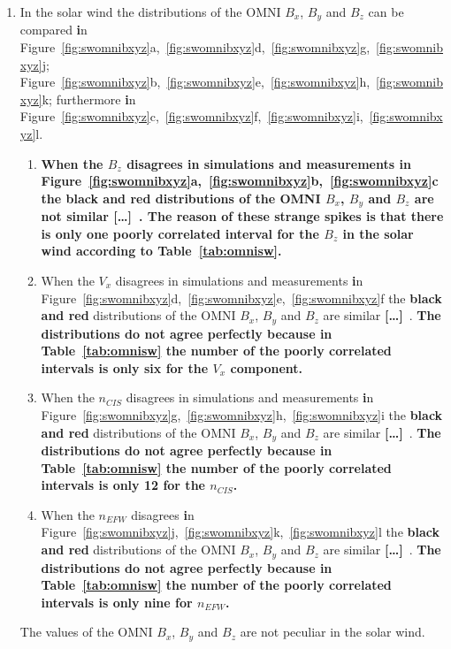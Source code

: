\documentclass[linenumbers,draft]{agujournal}
\newcommand{\del}{\textbf{[\dots]}\ } %
\begin{document}
\begin{enumerate}
\item In the solar wind the distributions of the OMNI $B_{x}$, $B_{y}$ and $B_{z}$ can be compared \textbf{i}n Figure~\ref{fig:swomnibxyz}a,~\ref{fig:swomnibxyz}d,~\ref{fig:swomnibxyz}g,~\ref{fig:swomnibxyz}j; Figure~\ref{fig:swomnibxyz}b,~\ref{fig:swomnibxyz}e,~\ref{fig:swomnibxyz}h,~\ref{fig:swomnibxyz}k; furthermore \textbf{i}n Figure~\ref{fig:swomnibxyz}c,~\ref{fig:swomnibxyz}f,~\ref{fig:swomnibxyz}i,~\ref{fig:swomnibxyz}l.
\begin{enumerate}
\item \textbf{When the $B_{z}$ disagrees in simulations and measurements \textbf{i}n Figure~\ref{fig:swomnibxyz}a,~\ref{fig:swomnibxyz}b,~\ref{fig:swomnibxyz}c the black and red distributions of the OMNI $B_{x}$, $B_{y}$ and $B_{z}$ are not similar \del. The reason of these strange spikes is that there is only one poorly correlated interval for the $B_{z}$ in the solar wind according to Table~\ref{tab:omnisw}.}

\item When the $V_{x}$ disagrees in simulations and measurements \textbf{i}n Figure~\ref{fig:swomnibxyz}d,~\ref{fig:swomnibxyz}e,~\ref{fig:swomnibxyz}f the \textbf{black and red} distributions of the OMNI $B_{x}$, $B_{y}$ and $B_{z}$ are similar \del. \textbf{The distributions do not agree perfectly because in Table~\ref{tab:omnisw} the number of the poorly correlated intervals is only six for the $V_{x}$ component.}

\item When the $n_{CIS}$ disagrees in simulations and measurements \textbf{i}n Figure~\ref{fig:swomnibxyz}g,~\ref{fig:swomnibxyz}h,~\ref{fig:swomnibxyz}i the \textbf{black and red} distributions of the OMNI $B_{x}$, $B_{y}$ and $B_{z}$ are similar \del. \textbf{The distributions do not agree perfectly because in Table~\ref{tab:omnisw} the number of the poorly correlated intervals is only 12 for the $n_{CIS}$.}
  
\item When the $n_{EFW}$ disagrees \textbf{i}n Figure~\ref{fig:swomnibxyz}j,~\ref{fig:swomnibxyz}k,~\ref{fig:swomnibxyz}l the \textbf{black and red} distributions of the OMNI $B_{x}$, $B_{y}$ and $B_{z}$ are similar \del . \textbf{The distributions do not agree perfectly because in Table~\ref{tab:omnisw} the number of the poorly correlated intervals is only nine for $n_{EFW}$.}
\end{enumerate}
The values of the OMNI $B_{x}$, $B_{y}$ and $B_{z}$ are not peculiar in the solar wind.


\end{enumerate}
\end{document}
